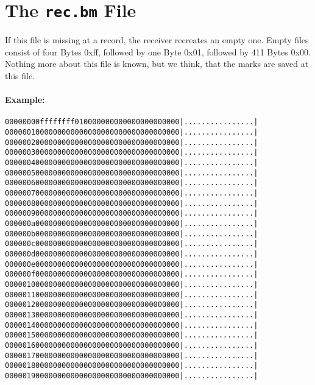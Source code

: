 \documentclass{scrartcl}
\begin{document}
\section{The \texttt{rec.bm} File}
\label{sec:rec.bm-file}

If this file is missing at a record, the receiver recreates an empty
one. Empty files consist of four Bytes 0xff, followed by one Byte 0x01,
followed by 411 Bytes 0x00. Nothing more about this file is known, but we
think, that the marks are saved at this file.

\paragraph{Example:}
{\small
\begin{alltt}
00000000  ff ff ff ff 01 00 00 00  00 00 00 00 00 00 00 00  |................|
00000010  00 00 00 00 00 00 00 00  00 00 00 00 00 00 00 00  |................|
00000020  00 00 00 00 00 00 00 00  00 00 00 00 00 00 00 00  |................|
00000030  00 00 00 00 00 00 00 00  00 00 00 00 00 00 00 00  |................|
00000040  00 00 00 00 00 00 00 00  00 00 00 00 00 00 00 00  |................|
00000050  00 00 00 00 00 00 00 00  00 00 00 00 00 00 00 00  |................|
00000060  00 00 00 00 00 00 00 00  00 00 00 00 00 00 00 00  |................|
00000070  00 00 00 00 00 00 00 00  00 00 00 00 00 00 00 00  |................|
00000080  00 00 00 00 00 00 00 00  00 00 00 00 00 00 00 00  |................|
00000090  00 00 00 00 00 00 00 00  00 00 00 00 00 00 00 00  |................|
000000a0  00 00 00 00 00 00 00 00  00 00 00 00 00 00 00 00  |................|
000000b0  00 00 00 00 00 00 00 00  00 00 00 00 00 00 00 00  |................|
000000c0  00 00 00 00 00 00 00 00  00 00 00 00 00 00 00 00  |................|
000000d0  00 00 00 00 00 00 00 00  00 00 00 00 00 00 00 00  |................|
000000e0  00 00 00 00 00 00 00 00  00 00 00 00 00 00 00 00  |................|
000000f0  00 00 00 00 00 00 00 00  00 00 00 00 00 00 00 00  |................|
00000100  00 00 00 00 00 00 00 00  00 00 00 00 00 00 00 00  |................|
00000110  00 00 00 00 00 00 00 00  00 00 00 00 00 00 00 00  |................|
00000120  00 00 00 00 00 00 00 00  00 00 00 00 00 00 00 00  |................|
00000130  00 00 00 00 00 00 00 00  00 00 00 00 00 00 00 00  |................|
00000140  00 00 00 00 00 00 00 00  00 00 00 00 00 00 00 00  |................|
00000150  00 00 00 00 00 00 00 00  00 00 00 00 00 00 00 00  |................|
00000160  00 00 00 00 00 00 00 00  00 00 00 00 00 00 00 00  |................|
00000170  00 00 00 00 00 00 00 00  00 00 00 00 00 00 00 00  |................|
00000180  00 00 00 00 00 00 00 00  00 00 00 00 00 00 00 00  |................|
00000190  00 00 00 00 00 00 00 00  00 00 00 00 00 00 00 00  |................|
\end{alltt}
}
\end{document}

